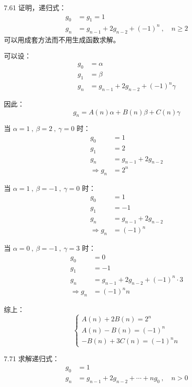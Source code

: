 \begin{problem}{7.6}{1}
  证明，递归式：
  \begin{align*}
    g_0 &= g_1 = 1 \\
    g_n &= g_{n-1} + 2 g_{n-2} + (-1)^n \ , \quad n \geqslant 2
  \end{align*}
  可以用成套方法而不用生成函数求解。
\end{problem}

可以设：
\begin{align*}
  g_0 &= \alpha \\
  g_1 &= \beta \\
  g_n &= g_{n-1} + 2g_{n-2} + (-1)^n \gamma
\end{align*}

因此：
\[
  g_n = A(n) \alpha + B(n) \beta + C(n) \gamma
\]

当 \( \alpha = 1 \ , \ \beta = 2 \ , \ \gamma = 0 \) 时：
\begin{align*}
  g_0 &= 1 \\
  g_1 &= 2 \\
  g_n &= g_{n-1} + 2 g_{n-2} \\
  \Rightarrow g_n &= 2^n
\end{align*}

当 \( \alpha = 1 \ , \ \beta = -1 \ , \ \gamma = 0 \) 时：
\begin{align*}
  g_0 &= 1 \\
  g_1 &= -1 \\
  g_n &= g_{n-1} + 2 g_{n-2} \\
  \Rightarrow g_n &= (-1)^n
\end{align*}

当 \( \alpha = 0 \ , \ \beta = -1 \ , \ \gamma = 3 \) 时：
\begin{align*}
  g_0 &= 0 \\
  g_1 &= -1 \\
  g_n &= g_{n-1} + 2 g_{n-2} + (-1)^n \cdot 3 \\
  \Rightarrow g_n &= (-1)^n n
\end{align*}

综上：
\[
  \begin{cases}
    A(n) + 2B(n) = 2^n \\
    A(n) - B(n) = (-1)^n \\
    -B(n) + 3C(n) = (-1)^n n
  \end{cases}
\]

\begin{problem}{7.7}{1}
  求解递归式：
  \begin{align*}
    g_0 &= 1 \\
    g_n &= g_{n-1} + 2 g_{n-2} + \cdots + n g_0 \ , \quad n > 0
  \end{align*}
\end{problem}

